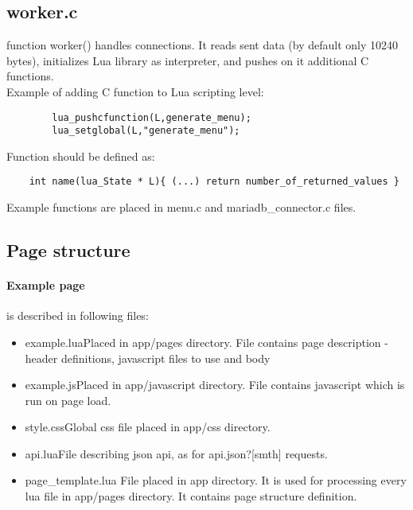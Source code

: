 \documentclass[a4paper]{article}
\begin{document}
\subsection{worker.c}
function worker() handles connections. It reads sent data (by default
only 10240 bytes), initializes Lua library as interpreter, and pushes
on it additional C functions.\\
Example of adding C function to Lua scripting level:\newline
\begin{verbatim}
		lua_pushcfunction(L,generate_menu);
		lua_setglobal(L,"generate_menu");
\end{verbatim}
Function should be defined as:\\
\begin{verbatim}
	int name(lua_State * L){ (...) return number_of_returned_values }
\end{verbatim}
Example functions are placed in menu.c and mariadb\_connector.c files.
\newpage
\subsection{Page structure}
\paragraph{Example page} is described in following files:
\begin{itemize}
	\item{example.lua}\newline\indent Placed in app/pages directory.
File contains page description - header definitions, javascript files to
use and body
	\item{example.js}\newline\indent Placed in app/javascript directory.
File contains javascript which is run on page load.
	\item{style.css}\newline\indent Global css file placed in app/css
directory.
	\item{api.lua}\newline\indent File describing json api, as for
api.json?[smth] requests.
	\item{page\_template.lua} File placed in app directory. It is used
for processing every lua file in app/pages directory. 
It contains page structure definition.
\end{itemize}
\end{document}

